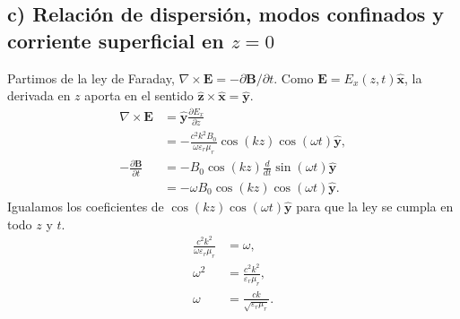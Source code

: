 \documentclass[11pt]{article}
\begin{document}
\subsection*{c) Relación de dispersión, modos confinados y corriente superficial en $z = 0$}
Partimos de la ley de Faraday,
$\nabla\times\mathbf E=-\partial\mathbf B/\partial t$.
Como $\mathbf E=E_x(z,t)\hat{\mathbf x}$, la derivada en $z$
aporta en el sentido $\hat{\mathbf z}\times\hat{\mathbf x}=\hat{\mathbf y}$.
\begin{align*}
    \nabla\times\mathbf E
    &=\hat{\mathbf y}\frac{\partial E_x}{\partial z}\\
    &=-\frac{c^2 k^2 B_0}{\omega\varepsilon_r\mu_r}
         \cos(kz)\cos(\omega t)\hat{\mathbf y},\\[4pt]
    -\frac{\partial\mathbf B}{\partial t}
    &=-B_0\cos(kz)\frac{d}{dt}\sin(\omega t)\hat{\mathbf y}\\
    &=-\omega B_0\cos(kz)\cos(\omega t)\hat{\mathbf y}.
\end{align*}
Igualamos los coeficientes de $\cos(kz)\cos(\omega t)\hat{\mathbf y}$
para que la ley se cumpla en todo $z$ y $t$.
\begin{align*}
    \frac{c^2 k^2}{\omega\varepsilon_r\mu_r}&=\omega,\\
    \omega^2&=\frac{c^2 k^2}{\varepsilon_r\mu_r},\\
    \omega&=\frac{ck}{\sqrt{\varepsilon_r\mu_r}}.
\end{align*}
\end{document}
